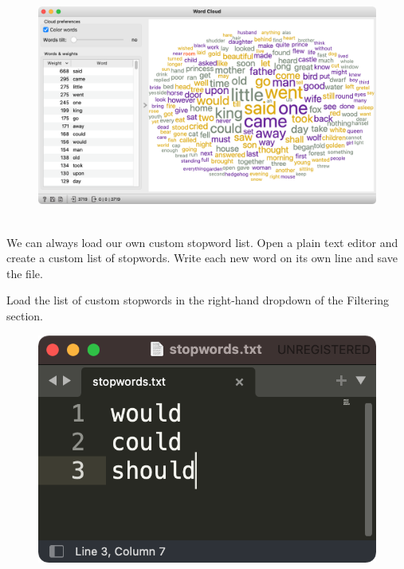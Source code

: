 \vspace{-0.2cm}
\begin{figure}[h]
  \centering
  \includegraphics[width=\linewidth]{preprocessed-word-cloud.png}%
  \caption{$\;$}
\end{figure}
\vspace{-0.3cm}

We can always  load our own custom stopword list. Open a plain text editor and create a custom list of stopwords. Write each new word on its own line and save the file.

Load the list of custom stopwords in the right-hand dropdown of the Filtering section.

\begin{figure}
  \includegraphics[scale=0.4]{editor.png}
  \caption{$\;$}
\end{figure}

